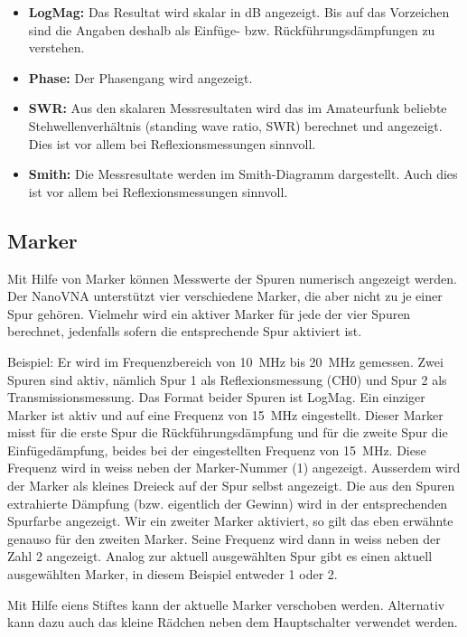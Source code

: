 \documentclass[twoside,a4paper,11pt,halfparskip,DIV=11,notitlepage]{scrartcl}
\begin{document}
\begin{itemize}
    \item \textbf{LogMag:} Das Resultat wird skalar in dB angezeigt. Bis auf das Vorzeichen sind
        die Angaben deshalb als Einfüge- bzw. Rückführungsdämpfungen zu verstehen.
    \item \textbf{Phase:} Der Phasengang wird angezeigt.
    \item \textbf{SWR:} Aus den skalaren Messresultaten wird das im Amateurfunk
        beliebte Stehwellenverhältnis (standing wave ratio, SWR) berechnet und
        angezeigt. Dies ist vor allem bei Reflexionsmessungen sinnvoll.
    \item \textbf{Smith:} Die Messresultate werden im Smith-Diagramm dargestellt. Auch dies
        ist vor allem bei Reflexionsmessungen sinnvoll.
\end{itemize}

\subsection{Marker}
Mit Hilfe von Marker können Messwerte der Spuren numerisch angezeigt werden. Der NanoVNA
unterstützt vier verschiedene Marker, die aber nicht zu je einer Spur gehören. Vielmehr
wird ein aktiver Marker für jede der vier Spuren berechnet, jedenfalls sofern die entsprechende
Spur aktiviert ist.

Beispiel: Er wird im Frequenzbereich von 10~MHz bis 20~MHz gemessen. Zwei Spuren sind aktiv,
nämlich Spur 1 als Reflexionsmessung (CH0) und Spur 2 als Transmissionsmessung. Das Format beider
Spuren ist LogMag. Ein einziger Marker ist aktiv und auf eine Frequenz von
15~MHz eingestellt. Dieser Marker misst für die erste Spur die Rückführungsdämpfung und für
die zweite Spur die Einfügedämpfung, beides bei der eingestellten Frequenz von 15~MHz. Diese
Frequenz wird in weiss neben der Marker-Nummer (1) angezeigt. Ausserdem wird der Marker als
kleines Dreieck auf der Spur selbst angezeigt. Die aus den Spuren extrahierte
Dämpfung (bzw. eigentlich der Gewinn) wird in der entsprechenden Spurfarbe
angezeigt. Wir ein zweiter Marker aktiviert, so gilt das eben erwähnte genauso für den zweiten
Marker. Seine Frequenz wird dann in weiss neben der Zahl 2 angezeigt. Analog zur aktuell
ausgewählten Spur gibt es einen aktuell ausgewählten Marker, in diesem Beispiel entweder 1 oder
2.

Mit Hilfe eiens Stiftes kann der aktuelle Marker verschoben werden. Alternativ kann dazu auch
das kleine Rädchen neben dem Hauptschalter verwendet werden.
\end{document}
